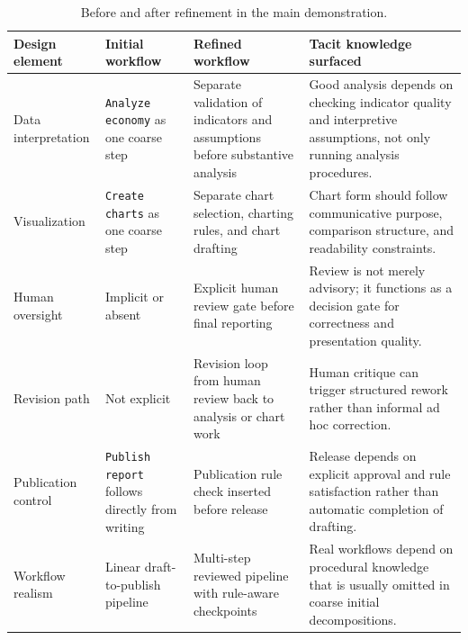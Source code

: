 \begin{table}[htbp]
\centering
\caption{Before and after refinement in the main demonstration.}
\begin{tabular}{p{3.0cm} p{3.6cm} p{4.2cm} p{5.2cm}}
\hline
\textbf{Design element} & \textbf{Initial workflow} & \textbf{Refined workflow} & \textbf{Tacit knowledge surfaced} \\
\hline
Data interpretation & \texttt{Analyze economy} as one coarse step & Separate validation of indicators and assumptions before substantive analysis & Good analysis depends on checking indicator quality and interpretive assumptions, not only running analysis procedures. \\
Visualization & \texttt{Create charts} as one coarse step & Separate chart selection, charting rules, and chart drafting & Chart form should follow communicative purpose, comparison structure, and readability constraints. \\
Human oversight & Implicit or absent & Explicit human review gate before final reporting & Review is not merely advisory; it functions as a decision gate for correctness and presentation quality. \\
Revision path & Not explicit & Revision loop from human review back to analysis or chart work & Human critique can trigger structured rework rather than informal ad hoc correction. \\
Publication control & \texttt{Publish report} follows directly from writing & Publication rule check inserted before release & Release depends on explicit approval and rule satisfaction rather than automatic completion of drafting. \\
Workflow realism & Linear draft-to-publish pipeline & Multi-step reviewed pipeline with rule-aware checkpoints & Real workflows depend on procedural knowledge that is usually omitted in coarse initial decompositions. \\
\hline
\end{tabular}
\end{table}
